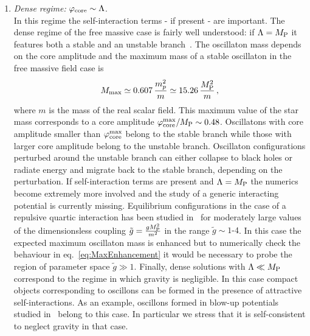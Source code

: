 \documentclass[11pt,a4paper]{article}
\begin{document}
\begin{enumerate}
\item{}{\it Dense regime:} $\varphi_{\rm core} \sim \Lambda$.\\
In this regime the self-interaction terms - if present - are important. The dense regime of the free massive case is fairly well understood: if $\Lambda = M_{\rm P}$ it features both a stable and an unstable branch~\cite{UrenaLopez:2002gx}. The oscillaton mass depends on the core amplitude and the maximum mass of a stable oscillaton in the free massive field case is
\begin{equation}
\label{eq:MaxOscillatonMass}
M_{\rm max} \simeq 0.607 \, \frac{m_p^2}{m} \simeq 15.26 \, \frac{M_{\rm P}^2}{m} \,,
\end{equation}
where $m$ is the mass of the real scalar field. This maximum value of the star mass corresponds to a core amplitude $\varphi_{\rm core}^{\rm max}/M_{\rm P} \sim 0.48$. Oscillatons with core amplitude smaller than $\varphi_{\rm core}^{\rm max}$ belong to the stable branch while those with larger core amplitude belong to the unstable branch. Oscillaton configurations perturbed around the unstable branch can either collapse to black holes or radiate energy and migrate back to the stable branch, depending on the perturbation. If self-interaction terms are present and $\Lambda = M_{\rm P}$ the numerics become extremely more involved and the study of a generic interacting potential is currently missing. Equilibrium configurations in the case of a repulsive quartic interaction has been studied in~\cite{ValdezAlvarado:2011dd, UrenaLopez:2012zz} for moderately large values of the dimensionsless coupling $\tilde{g} = \frac{g M_{\rm P}^2}{m^2}$ in the range $\tilde{g} \sim 1\text{-}4$. In this case the expected maximum oscillaton mass is enhanced but to numerically check the behaviour in eq.~\eqref{eq:MaxEnhancement} it would be necessary to probe the region of parameter space $\tilde{g} \gg 1$. Finally, dense solutions with $\Lambda \ll M_{\rm P}$ correspond to the regime in which gravity is negligible. In this case compact objects corresponding to oscillons can be formed in the presence of attractive self-interactions. As an example, oscillons formed in blow-up potentials studied in~\cite{Antusch:2017flz} belong to this case. In particular we stress that it is self-consistent to neglect gravity in that case.
\end{enumerate}
\end{document}
